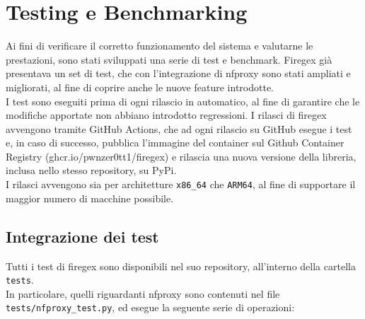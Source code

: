 \chapter{Testing e Benchmarking}

Ai fini di verificare il corretto funzionamento del sistema e valutarne le prestazioni, sono stati sviluppati una serie di test e benchmark. Firegex già presentava un set di test, che con l'integrazione di nfproxy sono stati ampliati e migliorati, al fine di coprire anche le nuove
feature introdotte.\\
I test sono eseguiti prima di ogni rilascio in automatico, al fine di garantire che le modifiche apportate non abbiano introdotto regressioni. I rilasci di firegex avvengono tramite GitHub Actions, che ad ogni rilascio su GitHub esegue i test e, in caso di successo, pubblica l'immagine del container sul Github Container Registry (ghcr.io/pwnzer0tt1/firegex) e rilascia una nuova versione della libreria, inclusa nello stesso repository, su PyPi.\\
I rilasci avvengono sia per architetture \texttt{x86\_64} che \texttt{ARM64}, al fine di supportare il maggior numero di macchine possibile.

\section{Integrazione dei test}

Tutti i test di firegex sono disponibili nel suo repository, all'interno della cartella \texttt{tests}.\\
In particolare, quelli riguardanti nfproxy sono contenuti nel file \texttt{tests/nfproxy\_test.py}, ed esegue la seguente serie di operazioni:

